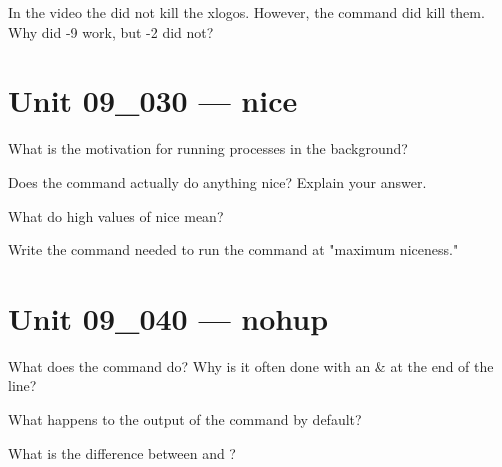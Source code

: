 \documentclass[letterpaper,12pt]{exam}
\newcommand{\unit}{Unit 09}
\begin{document}
\begin {questions}
\begin{samepage}
\question In the video the  did not kill the xlogos.  However, the command  did kill them.  Why did -9 work, but -2 did not?  
\vspace{5mm}
\end{samepage}

\section*{\unit\_030 --- nice}

\begin{samepage}
\question What is the motivation for running processes in the background? 
\vspace{5mm}
\end{samepage}

\begin{samepage}
\question Does the  command actually do anything nice? Explain your answer.
\vspace{5mm}
\end{samepage}

\begin{samepage}
\question  What do high values of nice mean?
\vspace{5mm}
\end{samepage}

\begin{samepage}
\question Write the command needed to run the  command at "maximum niceness." 
\vspace{5mm}
\end{samepage}

\section*{\unit\_040 --- nohup}

\begin{samepage}
\question What does the  command do?  Why is it often done with an & at the end of the line? 
\vspace{5mm}
\end{samepage}

\begin{samepage}
\question What happens to the output of the  command by default? 
\vspace{5mm}
\end{samepage}

\begin{samepage}
\question What is the difference between  and ? 
\vspace{5mm}
\end{samepage}


\end{questions}
\end{document}

